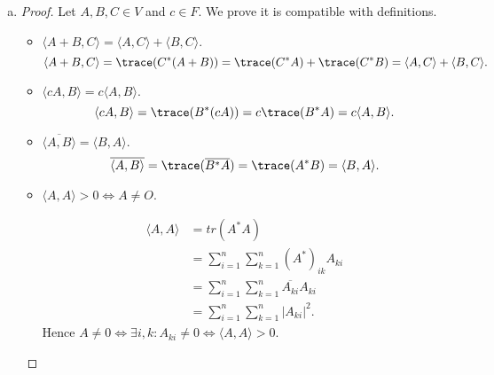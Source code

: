 \begin{Exercise}
	\begin{enumerate}[(a)]
		\item
		\begin{proof}
			Let $A,B,C\in V$ and $c\in F$. We prove it is compatible with definitions.
			\begin{itemize}
				\item $\langle A+B,C \rangle = \langle A,C \rangle + \langle B,C \rangle$.
				$$
				\langle A+B,C \rangle
				= \trace(C^*(A+B))
				= \trace(C^* A) + \trace(C^* B)
				= \langle A,C \rangle + \langle B,C \rangle.
				$$
				
				\item $\langle c A, B \rangle = c\langle A,B \rangle$.
				$$
				\langle c A,B \rangle
				= \trace(B^*(c A) )
				= c \trace( B^* A)
				= c\langle A,B \rangle.
				$$
				
				\item $\overline{\langle A,B \rangle} = \langle B,A \rangle$.
				$$
				\overline{\langle A,B \rangle}
				= \trace(\overline{B^* A} )
				= \trace(A^* B)
				= \langle B, A \rangle.
				$$
				
				\item $\langle A,A \rangle > 0\iff A\neq O$.
				
				\begin{align*}
				\langle A,A \rangle
				&= tr(A^* A) \\
				&= \sum_{i=1}^{n} \sum_{k=1}^{n} (A^*)_{i k} A_{k i} \\
				&=  \sum_{i=1}^{n} \sum_{k=1}^{n} \overline{A_{k i}} A_{k i} \\
				&= \sum_{i=1}^{n} \sum_{k=1}^{n} |A_{k i}|^2.
				\end{align*}
				Hence $A\neq 0 \iff \exists i,k:A_{k i} \neq 0 \iff \langle A,A \rangle > 0$.
			\end{itemize}
		\end{proof}
	\end{enumerate}
\end{Exercise}